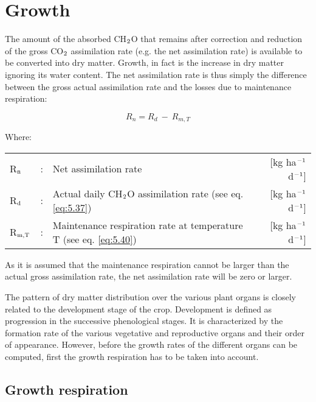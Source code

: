 \section{Growth}

The amount of the absorbed CH$_{{\rm 2}}$O that remains after correction and reduction of the
gross CO$_{{\rm 2}}$ assimilation rate (e.g. the net assimilation rate) is available to be 
converted into dry matter. Growth, 
in fact is the increase in dry matter ignoring its water content. The net assimilation rate
is thus simply the difference between the gross actual assimilation rate and the losses due to
maintenance respiration:

\begin{equation}
	R_{n} = R_{d} ~-~ R _{m,T} 
\end{equation}

Where:\\[5pt]
\begin{tabularx}{\textwidth}{llXr}
	R$_{{\rm n}}$ &:& Net assimilation rate   &     [kg ha$^{{\rm -1}}$ d$^{{\rm -1}}$]\\
	R$_{{\rm d}}$ &:& Actual daily CH$_{{\rm 2}}$O assimilation rate (see eq. \ref{eq:5.37})   &   
	[kg ha$^{{\rm -1}}$ d$^{{\rm -1}}$]\\
	R$_{{\rm m,T}}$ &:& Maintenance respiration rate at 
	temperature T (see eq. \ref{eq:5.40})   &     [kg ha$^{{\rm -1}}$ d$^{{\rm -1}}$]\\
\end{tabularx}

As it is assumed that the maintenance respiration cannot be larger than the actual gross 
assimilation rate, the net assimilation rate will be zero or larger.

The pattern of dry matter distribution over the various plant organs is closely related to
the development stage of the crop. Development is defined as progression in the successive 
phenological stages. It is characterized by the formation rate of the various vegetative
and reproductive organs and their order of appearance. However, before the growth rates
of the different organs can be computed, first the growth respiration has to be taken into account.

\subsection{Growth respiration}

